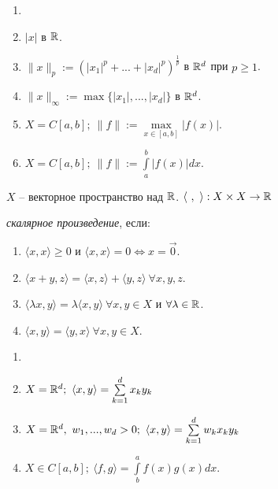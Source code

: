 \begin{example}
    \begin{enumerate}
        \item[]
        \item $|x|$ в $\mathbb{R}$.
        \item $\|x\|_p:=(|x_1|^p+...+|x_d|^p)^{\frac{1}{p}}$ в $\mathbb{R}^d$ при $p\geq 1$.
        \item $\|x\|_\infty:=\max\{|x_1|, ..., |x_d|\}$ в $\mathbb{R}^d$.
        \item $X=C[a, b];\ \|f\|:=\underset{x\in[a, b]}{\max}|f(x)|$.
        \item $X=C[a, b];\ \|f\|:=\int\limits_a^b|f(x)|dx$.
    \end{enumerate}
\end{example}

\begin{definition}
    $X$ – векторное пространство над $\mathbb{R}$. $\langle \ ,\ \rangle:X\times X\rightarrow \mathbb{R}$ 
    
    \textit{скалярное произведение}, если:
    \begin{enumerate}
        \item $\langle x, x \rangle\geq 0$ и $\langle x, x\rangle=0\Leftrightarrow x=\vec{0}$.
        \item $\langle x+y, z\rangle=\langle x, z \rangle +\langle y, z\rangle\ \forall x, y, z$.
        \item $\langle\lambda x, y \rangle=\lambda\langle x, y \rangle\ \forall x, y\in X$ и $\forall\lambda\in \mathbb{R}$.
        \item $\langle x, y\rangle=\langle y, x\rangle\ \forall x, y\in X$.
    \end{enumerate}
\end{definition}

\begin{example}
    \begin{enumerate}
        \item[] 
        \item $X=\mathbb{R}^d;\ \langle x, y\rangle=\sum\limits_{k=1}^d x_ky_k$
        \item $X=\mathbb{R}^d,\ w_1, ..., w_d>0;\ \langle x, y\rangle=\sum\limits_{k=1}^d w_k x_k y_k$
        \item $X\in C[a, b];\ \langle f, g\rangle=\int\limits_b^af(x)g(x)dx$.
    \end{enumerate}
\end{example}

